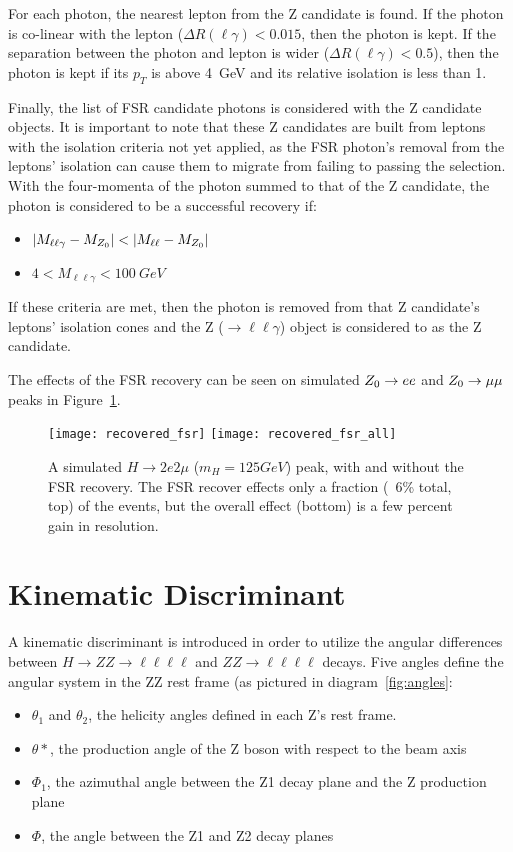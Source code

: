 For each photon, the nearest lepton from the Z candidate is found. If the photon
is co-linear with the lepton ($\Delta R(\ell \gamma) < 0.015$, then the photon is
kept. If the separation between the photon and lepton is wider ($\Delta R(\ell
\gamma) < 0.5$), then the photon is kept if its $p_T$ is above 4~GeV and its
relative isolation is less than 1.

Finally, the list of FSR candidate photons is considered with the Z candidate
objects.  It is important to note that these Z candidates are built from leptons
with the isolation criteria not yet applied, as the FSR photon's removal from
the leptons' isolation can cause them to migrate from failing to passing the
selection.  With the four-momenta of the photon summed to that of the Z
candidate, the photon is considered to be a successful recovery if:
\begin{itemize}
    \item $| M_{\ell \ell \gamma} - M_{{Z}_0} | < | M_{\ell \ell} - M_{{Z}_0} | $
    \item $4 < M_{\ell \ell \gamma} < 100~GeV$
\end{itemize}
If these criteria are met, then the photon is removed from that Z candidate's
leptons' isolation cones and the Z ($\rightarrow \ell \ell \gamma$) object is
considered to as the Z candidate.

The effects of the FSR recovery can be seen on simulated ${Z}_0 \rightarrow ee$ and ${Z}_0
\rightarrow \mu \mu$ peaks in Figure~\ref{fig:fsrRecovery}. 

\begin{figure}[h]
\centering
\texttt{[image: recovered\_fsr]}
\texttt{[image: recovered\_fsr\_all]}
\caption[A simulated $H\rightarrow2e2\mu$ ($m_H = 125 GeV$) peak, with and without FSR
recovery.]{A simulated $H\rightarrow2e2\mu$ ($m_H = 125 GeV$) peak, with and without the
    FSR recovery. The FSR recover effects only a fraction (~6\% total, top) of the
    events, but the overall effect (bottom) is a few percent gain in resolution.
}
\label{fig:fsrRecovery}
\end{figure}

\section{Kinematic Discriminant}
A kinematic discriminant is introduced in order to utilize the angular
differences between $H\rightarrow ZZ \rightarrow \ell\ell\ell\ell$ and $ZZ
\rightarrow \ell\ell\ell\ell$ decays. Five angles define the angular system in
the ZZ rest frame (as pictured in diagram~\ref{fig:angles}:
\begin{itemize}
    \item $\theta_1$ and $\theta_2$, the helicity angles defined in each Z's
        rest frame.
    \item $\theta\ast$, the production angle of the Z boson with respect to the
        beam axis
    \item $\Phi_1$, the azimuthal angle between the Z1 decay plane and the Z
        production plane
    \item $\Phi$, the angle between the Z1 and Z2 decay planes
\end{itemize}


